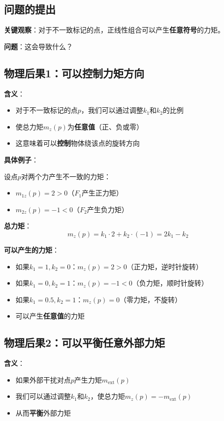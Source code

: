 \documentclass[12pt,a4paper]{article}
\begin{document}
\subsection{问题的提出}

\textbf{关键观察}：对于不一致标记的点，正线性组合可以产生\textbf{任意符号}的力矩。

\textbf{问题}：这会导致什么？

\subsection{物理后果1：可以控制力矩方向}

\textbf{含义}：
\begin{itemize}
\item 对于不一致标记的点$p$，我们可以通过调整$k_1$和$k_2$的比例
\item 使总力矩$m_z(p)$为\textbf{任意值}（正、负或零）
\item 这意味着可以\textbf{控制}物体绕该点的旋转方向
\end{itemize}

\textbf{具体例子}：

设点$p$对两个力产生不一致的力矩：
\begin{itemize}
\item $m_{1z}(p) = 2 > 0$（$F_1$产生正力矩）
\item $m_{2z}(p) = -1 < 0$（$F_2$产生负力矩）
\end{itemize}

\textbf{总力矩}：
\begin{equation}
m_z(p) = k_1 \cdot 2 + k_2 \cdot (-1) = 2k_1 - k_2
\end{equation}

\textbf{可以产生的力矩}：
\begin{itemize}
\item 如果$k_1 = 1, k_2 = 0$：$m_z(p) = 2 > 0$（正力矩，逆时针旋转）
\item 如果$k_1 = 0, k_2 = 1$：$m_z(p) = -1 < 0$（负力矩，顺时针旋转）
\item 如果$k_1 = 0.5, k_2 = 1$：$m_z(p) = 0$（零力矩，不旋转）
\item 可以产生\textbf{任意值}的力矩
\end{itemize}

\subsection{物理后果2：可以平衡任意外部力矩}

\textbf{含义}：
\begin{itemize}
\item 如果外部干扰对点$p$产生力矩$m_{\text{ext}}(p)$
\item 我们可以通过调整$k_1$和$k_2$，使总力矩$m_z(p) = -m_{\text{ext}}(p)$
\item 从而\textbf{平衡}外部力矩
\end{itemize}
\end{document}
